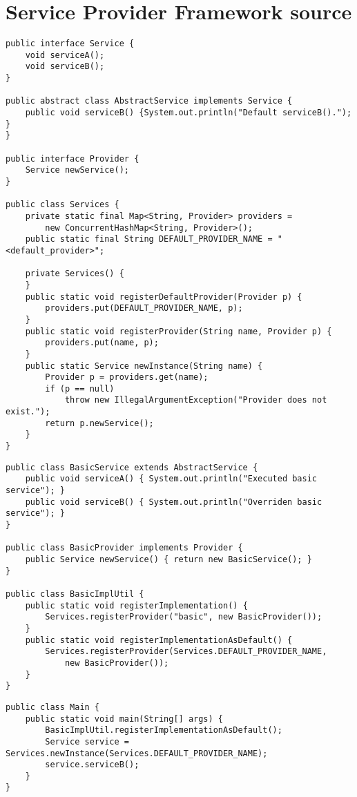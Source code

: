 \appendix
\chapter{Service Provider Framework source}
\label{examplesource}

\begin{lstlisting}[caption=Classes of the \code{service} package]
public interface Service {
	void serviceA();
	void serviceB();
}

public abstract class AbstractService implements Service {
	public void serviceB() {System.out.println("Default serviceB()."); }
}

public interface Provider {
	Service newService();
}

public class Services {
	private static final Map<String, Provider> providers = 
		new ConcurrentHashMap<String, Provider>();
	public static final String DEFAULT_PROVIDER_NAME = "<default_provider>";
	
	private Services() {
	}
	public static void registerDefaultProvider(Provider p) { 
		providers.put(DEFAULT_PROVIDER_NAME, p); 
	}
	public static void registerProvider(String name, Provider p) { 
		providers.put(name, p); 
	}
	public static Service newInstance(String name) {
		Provider p = providers.get(name);
		if (p == null) 
			throw new IllegalArgumentException("Provider does not exist.");
		return p.newService();
	}
}
\end{lstlisting}

\begin{lstlisting}[caption=Classes of the \code{impl} package]
public class BasicService extends AbstractService {
	public void serviceA() { System.out.println("Executed basic service"); }
	public void serviceB() { System.out.println("Overriden basic service"); }
} 

public class BasicProvider implements Provider {
	public Service newService() { return new BasicService(); }
}

public class BasicImplUtil {
	public static void registerImplementation() { 
		Services.registerProvider("basic", new BasicProvider()); 
	}
	public static void registerImplementationAsDefault() { 
		Services.registerProvider(Services.DEFAULT_PROVIDER_NAME, 
			new BasicProvider()); 
	}
}
\end{lstlisting}

\begin{lstlisting}[caption=Classes of the \code{client} package]
public class Main {
	public static void main(String[] args) {
		BasicImplUtil.registerImplementationAsDefault();
		Service service = Services.newInstance(Services.DEFAULT_PROVIDER_NAME);
		service.serviceB();
	}
}
\end{lstlisting}

